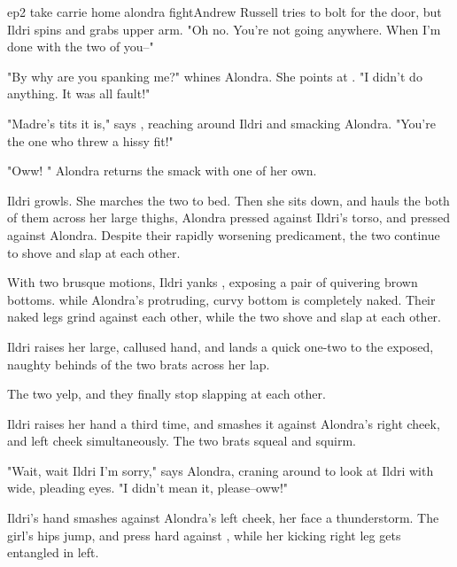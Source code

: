 \documentclass{book}
\begin{document}
\begin{childnode}{ep2 take carrie home alondra fight}{Andrew Russell}
    \name{} tries to bolt for the door, but Ildri spins and grabs \hisher{} upper arm. "Oh no. You're not going anywhere. When I'm done with the two of you--"

    "By why are you spanking me?" whines Alondra. She points at \name{}. "I didn't do anything. It was all \hisher{} fault!"

    "Madre's tits it is," says \name{}, reaching around Ildri and smacking Alondra. "You're the one who threw a hissy fit!"

    "Oww! " Alondra returns the smack with one of her own.

    Ildri growls. She marches the two  to \names{} bed. Then she sits down, and hauls the both of them across her large thighs, Alondra pressed 
    against Ildri's torso, and \name{} pressed against Alondra. Despite their rapidly worsening predicament, the two continue to shove and slap at each other.

    With two brusque motions, Ildri yanks , exposing a pair of quivering brown bottoms. 
    while Alondra's protruding, curvy bottom is completely naked. Their naked legs 
    grind against each other, while the two shove and slap at each other.
    
    Ildri raises her large, callused hand, and lands a quick one-two to the exposed, naughty behinds of the two brats across her lap. 

    The two yelp, and they finally stop slapping at each other.

    Ildri raises her hand a third time, and smashes it against Alondra's right cheek, and \names{} left cheek simultaneously. The two brats squeal and squirm.

    "Wait, wait Ildri I'm sorry," says Alondra, craning around to look at Ildri with wide, pleading eyes. "I didn't mean it, please--oww!"

    Ildri's hand smashes against Alondra's left cheek, her face a thunderstorm. The girl's hips jump, and press hard against \names{}, while her kicking right leg gets entangled in \names{} left.

    

\end{childnode}
\end{document}
